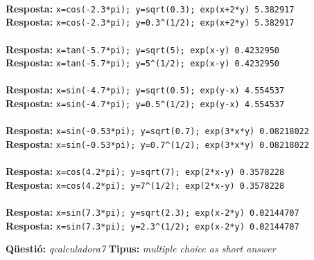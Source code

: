 \documentclass[10pt]{article}
\newcommand{\answer}{\textbf{Resposta: }}
\newcommand{\newquestion}[2]{\noindent\textbf{Qüestió: }\emph{#1} \textbf{Tipus: }\emph{#2}\medskip}
\begin{document}
\\
\answer{\verb?x=cos(-2.3*pi); y=sqrt(0.3); exp(x+2*y) 5.382917?}\\
\answer{\verb?x=cos(-2.3*pi); y=0.3^(1/2); exp(x+2*y) 5.382917?}\\

\\
\answer{\verb?x=tan(-5.7*pi); y=sqrt(5); exp(x-y) 0.4232950?}\\
\answer{\verb?x=tan(-5.7*pi); y=5^(1/2); exp(x-y) 0.4232950?}\\

\\
\answer{\verb?x=sin(-4.7*pi); y=sqrt(0.5); exp(y-x) 4.554537?}\\
\answer{\verb?x=sin(-4.7*pi); y=0.5^(1/2); exp(y-x) 4.554537?}\\

\\
\answer{\verb?x=sin(-0.53*pi); y=sqrt(0.7); exp(3*x*y) 0.08218022?}\\
\answer{\verb?x=sin(-0.53*pi); y=0.7^(1/2); exp(3*x*y) 0.08218022?}\\

\\
\answer{\verb?x=cos(4.2*pi); y=sqrt(7); exp(2*x-y) 0.3578228?}\\
\answer{\verb?x=cos(4.2*pi); y=7^(1/2); exp(2*x-y) 0.3578228?}\\

\\
\answer{\verb?x=sin(7.3*pi); y=sqrt(2.3); exp(x-2*y) 0.02144707?}\\
\answer{\verb?x=sin(7.3*pi); y=2.3^(1/2); exp(x-2*y) 0.02144707?}\\

\newpage

\newquestion{qcalculadora7}{multiple choice as short answer} 
\def\qcalculadora7{Digau quines de les paraules següents són noms correctes de variables en R, segons el que hem explicat als apunts de la lliçó 1. Heu de donar els números de les respostes correctes (ordenats, separats per espais en blanc, i sense els parèntesis); n'hi pot haver una, més d'una, o cap; si trobau que no n'hi ha cap, heu de donar el número de la resposta ``Cap d'elles''.}
\end{document}
